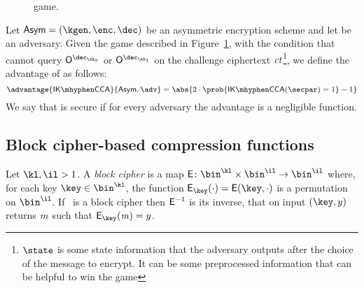 \begin{figure}[h!]
    \centering
\caption{\ikcca{} game.}\label{fig:ikcca}
\end{figure}

\begin{definition}[\ikcca]\label{preliminaries:def:ikcca}
    Let $\aSym = (\kgen,\enc, \dec)$ be an asymmetric encryption scheme and let \adv{} be an adversary. Given the \ikcca{} game described in Figure~\ref{fig:ikcca}, with the condition that \adv{} cannot query $\oracle{\dec_{\sk_0}}$ or $\oracle{\dec_{\sk_1}}$ on the challenge ciphertext $\mathit{ct}$\footnote{$\state$ is some state information that the adversary outputs after the choice of the message to encrypt. It can be some preprocessed information that can be helpful to win the game}, we define the \ikcca{} advantage of \adv{} as follows:
    \[
        \advantage{\ikcca}{\aSym,\adv} =  \abs{2\cdot\prob{\ikcca(\secpar) = 1} - 1}
    \]
    We say that \aSym{} is \ikcca{} secure if for every \ppt{} adversary \adv{} the advantage \advantage{\ikcca}{\aSym,\adv} is a negligible function.
\end{definition}

\subsection{Block cipher-based compression functions}\label{preliminaries:definitions:hashcomp}

\begin{definition}
    Let $\kl, \il > 1$. A \emph{block cipher} is a map $\Enc \colon \bin^{\kl} \times \bin^{\il} \to \bin^{\il}$ where, for each key $\key \in \bin^{\kl}$, the function $\Enc_\key(\cdot) = \Enc(\key, \cdot)$ is a permutation on $\bin^{\il}$. If \Enc~is a block cipher then $\mathsf{E}^{-1}$ is its inverse, that on input $(\key, y)$ returns $\mathit{m}$ such that $\Enc_\key(\msg) = y$.
\end{definition}


